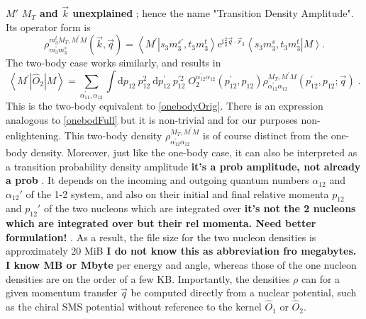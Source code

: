 \documentclass[a4paper,11pt]{article}
\newcommand\bv[1]{\vec{#1}}
\newcommand{\com}[1]{\color{blue}\small\textbf{ #1 }\color{black}\normalsize}
\begin{document}
$M'$\com{$M_T$ and $\vec{k}$ unexplained}; hence the name "Transition Density Amplitude". Its operator form is
\begin{equation}
  \rho_{m_{3}^{\prime} m_{3}^{s}}^{m_{3}^{t} M_{T}, M^{\prime}
  M}(\bv{k}, \bv{q})=\left\langle M^{\prime}\right.\left|s_{3}
  m_{3}^{s \prime}, t_{3} m_{3}^{t}\right\rangle
  \mathrm{e}^{\mathrm{i} \frac{2}{3} \bv{q} \cdot
  \bv{r}_{3}}\left\langle s_{3} m_{3}^{s}, t_{3}
  m_{3}^{t}\right|\left. M\right\rangle\label{onebodydens}.
\end{equation}
The two-body case works similarly, and results in
\begin{equation}
  \left\langle M^{\prime}\left|\hat{O}_{2}\right| M\right\rangle =
  \sum_{\alpha_{11}^{\prime}, \alpha_{12}} \int \mathrm{d} p_{12}\:
  p_{12}^{2} \mathrm{~d} p_{12}^{\prime}\: p_{12}^{\prime 2}\;
  O_{2}^{\alpha_{12}^{\prime} \alpha_{12}}\left(p_{12}^{\prime},
  p_{12}\right) \rho_{\alpha_{12}^{\prime} \alpha_{12}}^{M_{T},
  M^{\prime} M}\left(p_{12}^{\prime}, p_{12} ; \bv{q}\right)\label{twobody}\;.
\end{equation}
This is the two-body equivalent to \eqref{onebodyOrig}.
There is an expression analogous to \eqref{onebodFull} but it is
non-trivial and for our purposes non-enlightening.
This two-body density $\rho_{\alpha_{12}^{\prime}
\alpha_{12}}^{M_{T}, M^{\prime} M}$ is of course distinct
from the one-body density.
Moreover, just like the one-body case, it can also be interpreted as a
transition probability density amplitude \com{it's a prob amplitude, not already a prob}.
It depends on the incoming and outgoing quantum numbers
$\alpha_{12}$ and $\alpha_{12}'$ of the 1-2 system, and also on their initial and final
relative momenta $p_{12}$ and $p_{12}'$ of the two nucleons which are integrated over \com{it's not the 2 nucleons which are integrated over but their rel momenta. Need better formulation!}.
As a result, the file size for the two nucleon densities is approximately 20 MiB\com{I do not know this as abbreviation fro megabytes. I know MB or Mbyte}
per energy and angle, whereas those of the one
nucleon densities are on the order of a few KB.
Importantly, the densities $\rho$ can for a given momentum transfer $\vec{q}$ be computed directly from a nuclear
potential, such as the chiral SMS potential
\cite{Reinert2018}
without reference to the kernel $\hat{O}_1$ or $\hat{O}_{2}$.
\end{document}

